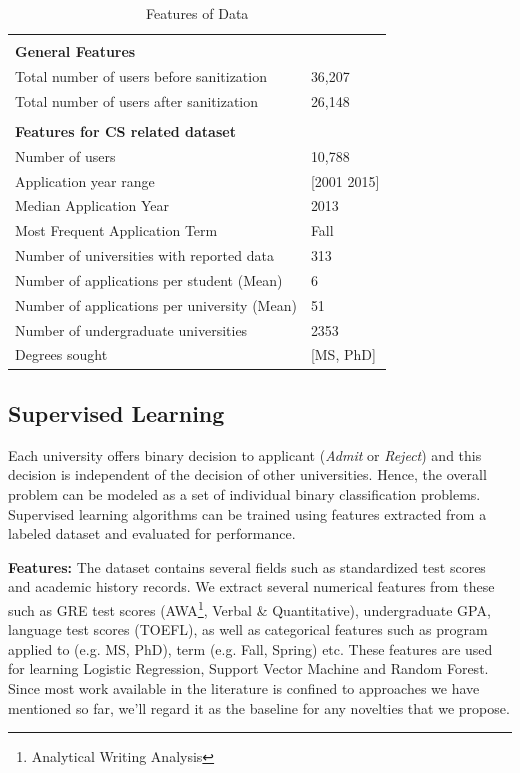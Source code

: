 \documentclass{sig-alternate-05-2015}
\begin{document}
\begin{table}[]
\centering
\caption{Features of Data}
\label{tab:dataset}
\begin{tabular}{ll}
& \\
\textbf{General Features} & \\
\hline
Total number of users before sanitization & 36,207 \\
Total number of users after sanitization & 26,148 \\
& \\
\textbf{Features for CS related dataset} & \\
\hline
Number of users & 10,788 \\
Application year range & [2001 2015] \\
Median Application Year & 2013 \\
Most Frequent Application Term & Fall \\
Number of universities with reported data & 313 \\
Number of applications per student (Mean) & 6 \\
Number of applications per university (Mean) & 51 \\
Number of undergraduate universities & 2353 \\
Degrees sought & [MS, PhD] \\
\hline
\end{tabular}
\end{table}


\subsection{Supervised Learning}
\label{subsec:supervised-learning}
Each university offers binary decision to applicant (\textit{Admit} or \textit{Reject}) and this decision is independent of the decision of other universities. Hence, the overall problem can be modeled as a set of individual binary classification problems. Supervised learning algorithms can be trained using features extracted from a labeled dataset and evaluated for performance.

\textbf{Features:}
The dataset contains several fields such as standardized test scores and academic history records. We extract several numerical features from these such as GRE test scores (AWA\footnote{Analytical Writing Analysis}, Verbal \& Quantitative), undergraduate GPA, language test scores (TOEFL), as well as categorical features such as program applied to (e.g. MS, PhD), term (e.g. Fall, Spring) etc. These features are used for learning Logistic Regression, Support Vector Machine and Random Forest. Since most work available in the literature is confined to approaches we have mentioned so far, we'll regard it as the baseline for any novelties that we propose.
\end{document}
